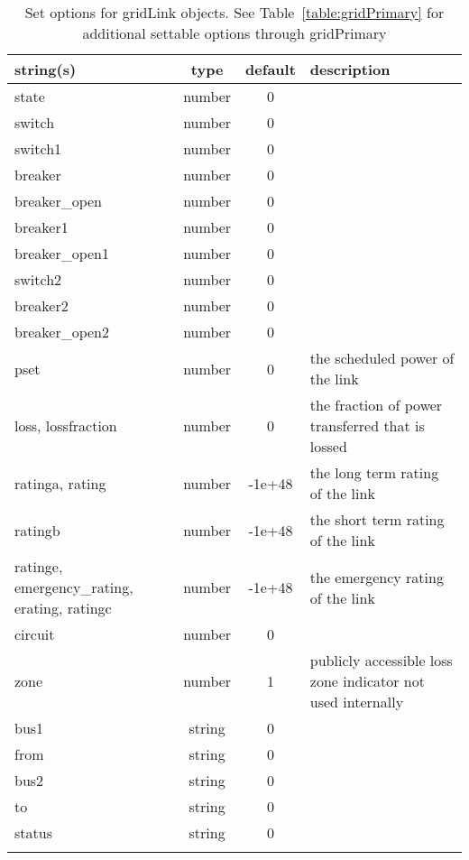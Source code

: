 \begin{longtable}{p{5cm} c c p{7cm}}
string(s) & type & default & description \\
\hline
state & number & 0 & \\
switch & number & 0 & \\
switch1 & number & 0 & \\
breaker & number & 0 & \\
breaker\_open & number & 0 & \\
breaker1 & number & 0 & \\
breaker\_open1 & number & 0 & \\
switch2 & number & 0 & \\
breaker2 & number & 0 & \\
breaker\_open2 & number & 0 & \\
pset & number & 0 & the scheduled power of the link\\
loss, lossfraction & number & 0 & the fraction of power transferred that is lossed\\
ratinga, rating & number & -1e+48 & the long term rating of the link\\
ratingb & number & -1e+48 & the short term rating of the link\\
ratinge, emergency\_rating, erating, ratingc & number & -1e+48 & the emergency rating of the link\\
circuit & number & 0 & \\
zone & number & 1 & publicly accessible loss zone indicator not used internally\\
bus1 & string & 0 & \\
from & string & 0 & \\
bus2 & string & 0 & \\
to & string & 0 & \\
status & string & 0 & \\
\hline
\caption{Set options for gridLink objects. See Table~\ref{table:gridPrimary} for additional settable options through gridPrimary}
\label{table:gridLink}
\end{longtable}
